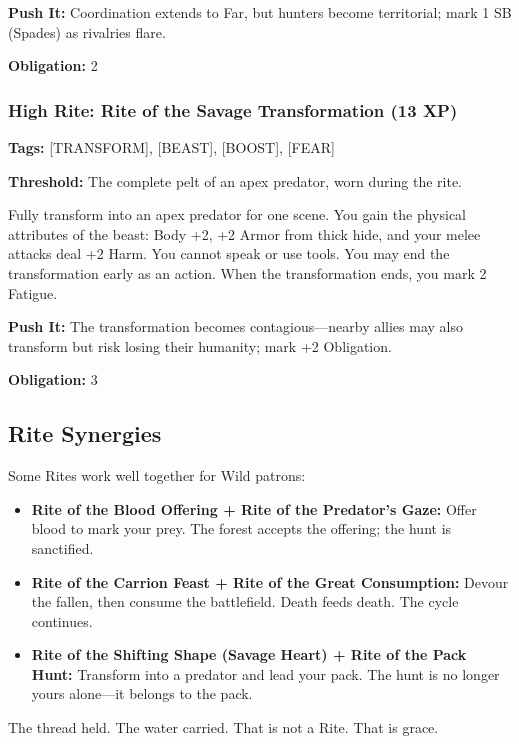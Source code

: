 \textbf{Push It:} Coordination extends to Far, but hunters become territorial; mark 1 SB (Spades) as rivalries flare.

\textbf{Obligation:} 2

\subsubsection{High Rite: Rite of the Savage Transformation (13 XP)}

\textbf{Tags:} [TRANSFORM], [BEAST], [BOOST], [FEAR]

\textbf{Threshold:} The complete pelt of an apex predator, worn during the rite.

Fully transform into an apex predator for one scene. You gain the physical attributes of the beast: Body +2, +2 Armor from thick hide, and your melee attacks deal +2 Harm. You cannot speak or use tools. You may end the transformation early as an action. When the transformation ends, you mark 2 Fatigue.

\textbf{Push It:} The transformation becomes contagious—nearby allies may also transform but risk losing their humanity; mark +2 Obligation.

\textbf{Obligation:} 3

\subsection{Rite Synergies}

Some Rites work well together for Wild patrons:

\begin{itemize}
\item \textbf{Rite of the Blood Offering + Rite of the Predator's Gaze:} Offer blood to mark your prey. The forest accepts the offering; the hunt is sanctified.
\item \textbf{Rite of the Carrion Feast + Rite of the Great Consumption:} Devour the fallen, then consume the battlefield. Death feeds death. The cycle continues.
\item \textbf{Rite of the Shifting Shape (Savage Heart) + Rite of the Pack Hunt:} Transform into a predator and lead your pack. The hunt is no longer yours alone—it belongs to the pack.
\end{itemize}

The thread held. The water carried. That is not a Rite. That is grace.
